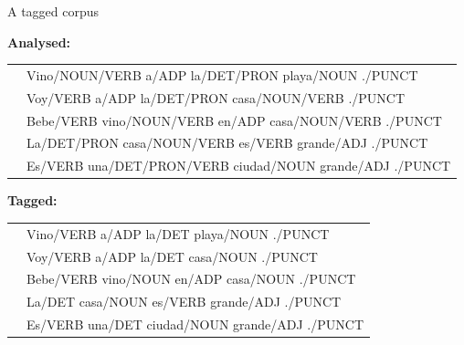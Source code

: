 \documentclass{beamer}
\begin{document}
\begin{frame}{A tagged corpus}

\textbf{Analysed:} \\
\begin{tabular}{ll}
& Vino/NOUN/VERB a/ADP la/DET/PRON playa/NOUN ./PUNCT \\
& Voy/VERB a/ADP la/DET/PRON casa/NOUN/VERB ./PUNCT \\
& Bebe/VERB vino/NOUN/VERB en/ADP casa/NOUN/VERB ./PUNCT \\
& La/DET/PRON casa/NOUN/VERB es/VERB grande/ADJ ./PUNCT \\
& Es/VERB una/DET/PRON/VERB ciudad/NOUN grande/ADJ ./PUNCT \\
\end{tabular} 

\textbf{Tagged:} \\
\begin{tabular}{ll}
& Vino/VERB a/ADP la/DET playa/NOUN ./PUNCT \\
& Voy/VERB a/ADP la/DET casa/NOUN ./PUNCT \\
& Bebe/VERB vino/NOUN en/ADP casa/NOUN ./PUNCT \\
& La/DET casa/NOUN es/VERB grande/ADJ ./PUNCT \\
& Es/VERB una/DET ciudad/NOUN grande/ADJ ./PUNCT \\
\end{tabular}

\end{frame}
\end{document}
